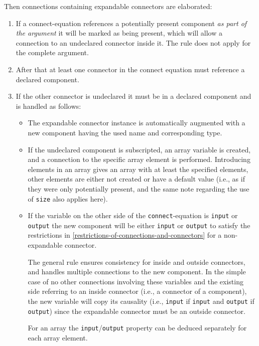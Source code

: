 Then connections containing expandable connectors are elaborated:
\begin{enumerate}
\item
  If a connect-equation references a potentially present component \emph{as part of the argument} it will be marked as being present, which will allow a connection to an undeclared connector inside it.
  The rule does not apply for the complete argument.
\item
  After that at least one connector in the connect equation must reference a declared component.
\item
  If the other connector is undeclared it must be in a declared component and is handled as follows:
  \begin{itemize}
  \item
    The expandable connector instance is automatically augmented with a new component having the used name and corresponding type.
  \item
    If the undeclared component is subscripted, an array variable is created, and a connection to the specific array element is performed.
    Introducing elements in an array gives an array with at least the specified elements, other elements are either not created or have a default value (i.e., as if they were only potentially present, and the same note regarding the use of \lstinline!size! also applies here).
  \item
    If the variable on the other side of the \lstinline!connect!-equation is \lstinline!input! or \lstinline!output! the new component will be either \lstinline!input! or \lstinline!output! to satisfy the restrictions in \cref{restrictions-of-connections-and-connectors} for a non-expandable connector.
    \begin{nonnormative}
    The general rule ensures consistency for inside and outside connectors, and handles multiple connections to the new component.
    In the simple case of no other connections involving these variables and the existing side referring to an inside connector (i.e., a connector of a component), the new variable will copy its causality (i.e., \lstinline!input! if \lstinline!input! and \lstinline!output! if \lstinline!output!) since the expandable connector must be an outside connector.
    \end{nonnormative}
    For an array the \lstinline!input!/\lstinline!output! property can be deduced separately for each array element.
  \end{itemize}
\end{enumerate}

